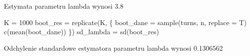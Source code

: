 \documentclass[
]{article}
\newenvironment{Shaded}{\begin{snugshade}}{\end{snugshade}}
\newcommand{\AttributeTok}[1]{\textcolor[rgb]{0.77,0.63,0.00}{#1}}
\newcommand{\DecValTok}[1]{\textcolor[rgb]{0.00,0.00,0.81}{#1}}
\newcommand{\FunctionTok}[1]{\textcolor[rgb]{0.00,0.00,0.00}{#1}}
\newcommand{\NormalTok}[1]{#1}
\newcommand{\OtherTok}[1]{\textcolor[rgb]{0.56,0.35,0.01}{#1}}
\begin{document}
Estymata parametru lambda wynosi 3.8

\begin{Shaded}
\begin{Highlighting}[]
\NormalTok{K }\OtherTok{=} \DecValTok{1000}
\NormalTok{boot\_res }\OtherTok{=} \FunctionTok{replicate}\NormalTok{(K, \{}
\NormalTok{  boot\_dane }\OtherTok{=} \FunctionTok{sample}\NormalTok{(turns, n, }\AttributeTok{replace =}\NormalTok{ T)}
  \FunctionTok{c}\NormalTok{(}\FunctionTok{mean}\NormalTok{(boot\_dane))}
\NormalTok{\})}
\NormalTok{sd\_lambda }\OtherTok{=} \FunctionTok{sd}\NormalTok{(boot\_res)}
\end{Highlighting}
\end{Shaded}

Odchylenie standardowe estymatora parametru lambda wynosi 0.1306562
\end{document}
